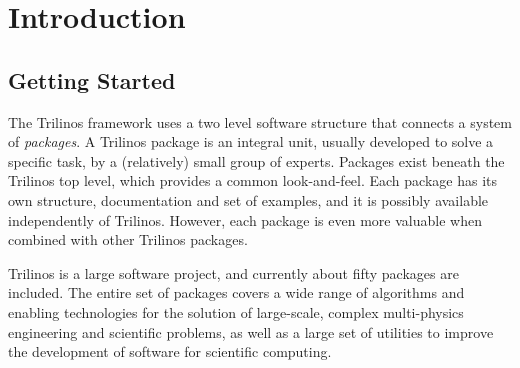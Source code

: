 %
%
%
%
%
%

\chapter{Introduction}


\section{Getting Started}
\label{sec:getting}

The Trilinos framework uses a two level software structure that connects
a system of {\sl packages}. A Trilinos package is an integral unit,
usually developed to solve a specific task, by a (relatively) small
group of experts.  Packages exist beneath the Trilinos top level,
which provides a common look-and-feel. Each package has its own
structure, documentation and set of examples, and it is possibly
available independently of Trilinos. However, each package is even more
valuable when combined with other Trilinos packages.

\smallskip

Trilinos is a large software project, and currently about fifty 
packages are included.  The entire set of packages covers a wide range
of algorithms and enabling technologies for the solution of large-scale,
complex multi-physics engineering and scientific problems, as well as a
large set of utilities to improve the development of software for scientific
computing.

